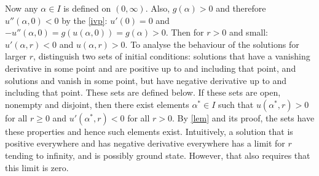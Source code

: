 Now any $\alpha\in I$ is defined on $(0,\infty)$. Also, $g(\alpha)>0$ and therefore $u''(\alpha,0)<0$ by the \eqref{ivp}: $u'(0)=0$ and $-u''(\alpha,0)=g(u(\alpha,0))=g(\alpha)>0$. Then for $r>0$ and small: $u'(\alpha,r)<0$ and $u(\alpha,r)>0$. To analyse the behaviour of the solutions for larger $r$, distinguish two sets of initial conditions: solutions that have a vanishing derivative in some point and are positive up to and including that point, and solutions and vanish in some point, but have negative derivative up to and including that point. {\color{red}These sets are defined below.} If these sets are open, nonempty and disjoint, then there exist elements $\alpha^*\in I$ such that $u(\alpha^*,r)>0$ for all $r\geq0$ and $u'(\alpha^*,r)<0$ for all $r>0$. By \cref{lem} and its proof, the sets have these properties and hence such elements exist. Intuitively, a solution that is positive everywhere and has negative derivative everywhere has a limit for $r$ tending to infinity, and is possibly ground state. However, that also requires that this limit is zero.

